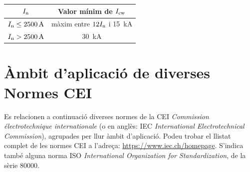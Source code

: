 \begin{list}{}
	\begin{center}
		 \label{taula:InIcw}
		\begin{tabular}{cc}
			\toprule[1pt]
			$I_\mathrm{n}$ &  Valor mínim de $I_\mathrm{cw}$ \\
			\midrule
			$I_\mathrm{n} \leq \qty{2500}{A}$  & màxim entre $12  I_\mathrm{n}$ i \qty{15}{kA}  \\
			$I_\mathrm{n} > \qty{2500}{A}$  & \qty{30}{kA}   \\
			\bottomrule[1pt]
		\end{tabular}
	\end{center}
\end{list}


\section{Àmbit d'aplicació de diverses Normes CEI}\label{sec:normes_IEC}

Es relacionen a continuació diverses normes de la CEI \textit{Commission électrotechnique internationale} (o en anglès: IEC \textit{International Electrotechnical Commission}), agrupades per llur àmbit d'aplicació. Podeu trobar el llistat complet de les normes CEI a l'adreça: \href{https://www.iec.ch/homepage}{https:/\!\!/www.iec.ch/homepage}. S'indica també alguna norma ISO \textit{International Organization for Standardization}, de la sèrie 80000.

